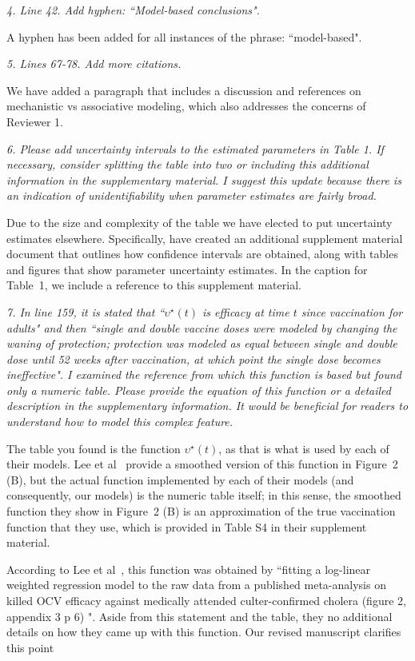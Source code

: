 \documentclass[11pt]{article}
\newcommand\report[1]{{\color{mygreen} \vspace{1mm}\hspace{0.25in}\parbox{6in}{\em #1}}}
\newcommand\article[1]{{\color{blue} \vspace{1mm}\hspace{0.25in}\parbox{6in}{\em #1}}}
\begin{document}
\report{
  4. Line 42. Add hyphen: ``Model-based conclusions".
}

A hyphen has been added for all instances of the phrase: ``model-based".

\report{
  5. Lines 67-78. Add more citations.
}

We have added a paragraph that includes a discussion and references on mechanistic vs associative modeling, which also addresses the concerns of Reviewer 1.

\article{\editMechModels}

\report{
  6. Please add uncertainty intervals to the estimated parameters in Table 1. If necessary, consider splitting the table into two or including this additional information in the supplementary material. I suggest this update because there is an indication of unidentifiability when parameter estimates are fairly broad.
}

Due to the size and complexity of the table we have elected to put uncertainty estimates elsewhere. Specifically, have created an additional supplement material document that outlines how confidence intervals are obtained, along with tables and figures that show parameter uncertainty estimates. In the caption for Table~1, we include a reference to this supplement material.

\report{
  7. In line 159, it is stated that ``$\upsilon^\star(t)$ is efficacy at time $t$ since vaccination for adults" and then ``single and double vaccine doses were modeled by changing the waning of protection; protection was modeled as equal between single and double dose until 52 weeks after vaccination, at which point the single dose becomes ineffective". I examined the reference from which this function is based but found only a numeric table. Please provide the equation of this function or a detailed description in the supplementary information. It would be beneficial for readers to understand how to model this complex feature.
}

The table you found is the function $\upsilon^\star(t)$, as that is what is used by each of their models. Lee et al~\cite{lee20} provide a smoothed version of this function in Figure~2 (B), but the actual function implemented by each of their models (and consequently, our models) is the numeric table itself; in this sense, the smoothed function they show in Figure~2 (B) is an approximation of the true vaccination function that they use, which is provided in Table S4 in their supplement material.

According to Lee et al~\cite{lee20}, this function was obtained by ``fitting a log-linear weighted regression model to the raw data from a published meta-analysis on killed OCV efficacy against medically attended culter-confirmed cholera (figure 2, appendix 3 p 6) \cite{bi17}". Aside from this statement and the table, they no additional details on how they came up with this function. Our revised manuscript clarifies this point
\end{document}
